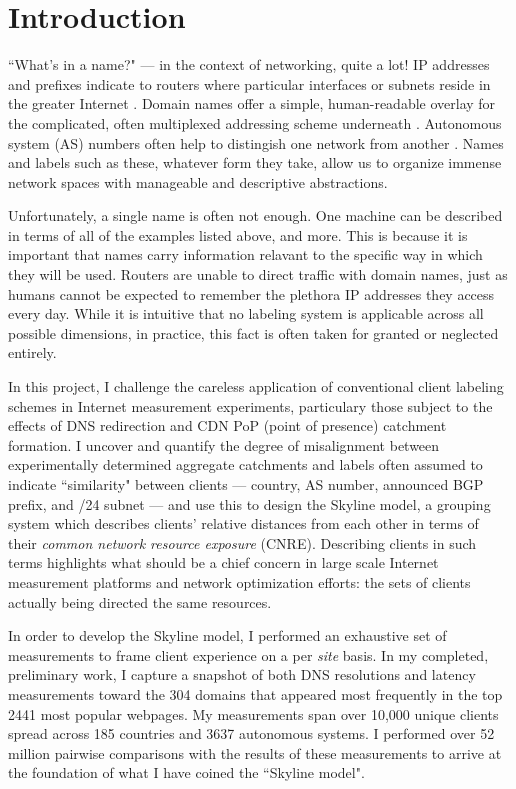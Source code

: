 \section{Introduction} \label{sect:intro}

``What's in a name?" --- in the context of networking, quite a lot! IP addresses and prefixes
indicate to routers where particular interfaces or subnets reside in the greater Internet
\cite{bgp}. Domain
names offer a simple, human-readable overlay for the complicated, often multiplexed addressing
scheme underneath \cite{dns}. Autonomous system (AS) numbers often help to distingish one network
from another \cite{asn}.
Names and labels such as these, whatever form they take, allow us to organize immense network spaces
with manageable and descriptive abstractions.

Unfortunately, a single name is often not enough. One machine can be described in terms of all of
the examples listed above, and more. This is because it is important that names carry information
relavant to the specific way in which they will be used. Routers are unable to direct traffic with
domain names, just as humans cannot be expected to remember the plethora IP addresses they access
every day. While it is intuitive that no labeling system is applicable across all possible
dimensions, in practice, this fact is often taken for granted or neglected entirely.

In this project, I challenge the careless application of conventional client labeling schemes in
Internet measurement experiments, particulary those subject to the effects of DNS redirection and
CDN PoP (point of presence) catchment formation. I uncover and quantify the degree of misalignment
between experimentally determined aggregate catchments and labels often assumed to indicate
``similarity" between clients --- country, AS number, announced BGP prefix, and /24 subnet --- and
use this to design the Skyline model, a grouping system which describes clients' relative distances
from each other in terms of their \emph{common network resource exposure} (CNRE). Describing clients in such
terms highlights what should be a chief concern in large scale Internet measurement platforms and
network optimization efforts: the sets of clients actually being directed the same resources.

In order to develop the Skyline model, I performed an exhaustive set of measurements to frame
client experience on a per \emph{site} basis. In my completed, preliminary work, I capture a
snapshot of both DNS resolutions and latency measurements toward the 304 domains that appeared most
frequently in the top 2441 most popular webpages. My measurements span over 10,000 unique
clients spread across 185 countries and 3637 autonomous systems. I performed over 52 million pairwise
comparisons with the results of these measurements to arrive at the foundation of what I have
coined the ``Skyline model". 

